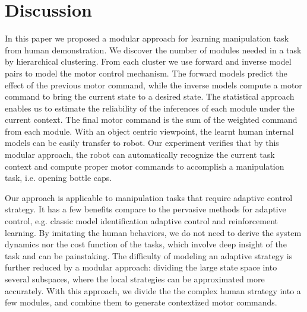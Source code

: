 \section{Discussion}
\label{cha4:sec4}

In this paper we proposed a modular approach for learning manipulation task from human demonstration. We discover the number of modules needed in a task by hierarchical clustering. From each cluster we use forward and inverse model pairs to model the motor control mechanism. The forward models predict the effect of the previous motor command, while the inverse models compute a motor command to bring the current state to a desired state. The statistical approach enables us to estimate the reliability of the inferences of each module under the current context. The final motor command is the sum of the weighted command from each module. With an object centric viewpoint, the learnt human internal models can be easily transfer to robot. Our experiment verifies that by this modular approach, the robot can automatically recognize the current task context and compute proper motor commands to accomplish a manipulation task, i.e. opening bottle caps.


Our approach is applicable to manipulation tasks that require adaptive control strategy. It has a few benefits compare to the pervasive methods for adaptive control, e.g. classic model identification adaptive control and reinforcement learning. By imitating the human behaviors, we do not need to derive the system dynamics nor the cost function of the tasks, which involve deep insight of the task and can be painstaking. The difficulty of modeling an adaptive strategy is further reduced by a modular approach: dividing the large state space into several subspaces, where the local strategies can be approximated more accurately. With this approach, we divide the the complex human strategy into a few modules, and combine them to generate contextized motor commands.

